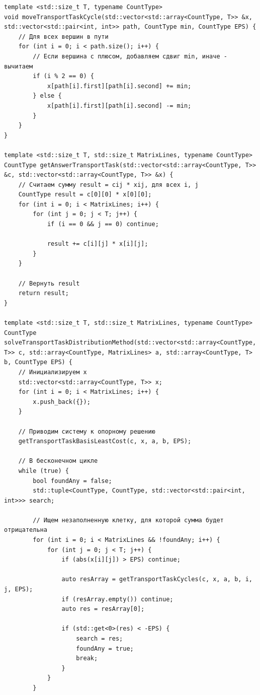 \documentclass[a4paper,14pt]{extarticle}
\begin{document}
\begin{verbatim}
template <std::size_t T, typename CountType>
void moveTransportTaskCycle(std::vector<std::array<CountType, T>> &x, std::vector<std::pair<int, int>> path, CountType min, CountType EPS) {
    // Для всех вершин в пути
    for (int i = 0; i < path.size(); i++) {
        // Если вершина с плюсом, добавляем сдвиг min, иначе - вычитаем
        if (i % 2 == 0) {
            x[path[i].first][path[i].second] += min;
        } else {
            x[path[i].first][path[i].second] -= min;
        }
    }
}

template <std::size_t T, std::size_t MatrixLines, typename CountType>
CountType getAnswerTransportTask(std::vector<std::array<CountType, T>> &c, std::vector<std::array<CountType, T>> &x) {
    // Считаем сумму result = cij * xij, для всех i, j 
    CountType result = c[0][0] * x[0][0];
    for (int i = 0; i < MatrixLines; i++) {
        for (int j = 0; j < T; j++) {
            if (i == 0 && j == 0) continue;

            result += c[i][j] * x[i][j];
        }
    }

    // Вернуть result
    return result;
}

template <std::size_t T, std::size_t MatrixLines, typename CountType>
CountType solveTransportTaskDistributionMethod(std::vector<std::array<CountType, T>> c, std::array<CountType, MatrixLines> a, std::array<CountType, T> b, CountType EPS) {
    // Инициализируем x
    std::vector<std::array<CountType, T>> x;
    for (int i = 0; i < MatrixLines; i++) {
        x.push_back({});
    }

    // Приводим систему к опорному решению
    getTransportTaskBasisLeastCost(c, x, a, b, EPS);

    // В бесконечном цикле
    while (true) {
        bool foundAny = false;
        std::tuple<CountType, CountType, std::vector<std::pair<int, int>>> search;

        // Ищем незаполненную клетку, для которой сумма будет отрицательна
        for (int i = 0; i < MatrixLines && !foundAny; i++) {
            for (int j = 0; j < T; j++) {
                if (abs(x[i][j]) > EPS) continue;

                auto resArray = getTransportTaskCycles(c, x, a, b, i, j, EPS);
                if (resArray.empty()) continue;
                auto res = resArray[0];

                if (std::get<0>(res) < -EPS) {
                    search = res;
                    foundAny = true;
                    break;
                }
            }
        }


\end{verbatim}
\end{document}
